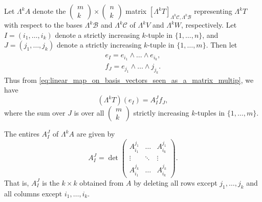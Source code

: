 \documentclass[notoc,notitlepage]{tufte-book}
\begin{document}
Let $\Lambda^k A$ denote the $\left(\begin{smallmatrix} m \\ k \end{smallmatrix}\right)
\times \left(\begin{smallmatrix} n \\ k \end{smallmatrix}\right)$ matrix $[\Lambda^k
T]_{\Lambda^k \mathcal{C}, \Lambda^k \mathcal{B}}$ representing $\Lambda^k T$
with respect to the bases $\Lambda^k \mathcal{B}$ and $\Lambda^k \mathcal{C}$ of
$\Lambda^k V$ and $\Lambda^k W$, respectively. Let $I = (i_1, \ldots, i_k)$
denote a strictly increasing $k$-tuple in $\{ 1, \ldots, n \}$, and $J = (j_1,
\ldots, j_k)$ denote a strictly increasing $k$-tuple in $\{ 1, \ldots, m \}$.
Then let
\begin{gather*}
  e_I = e_{i_1} \land \hdots \land e_{i_k}, \\
  f_J = e_{j_1} \land \hdots \land j_{j_k}.
\end{gather*}
Thus from \cref{eq:linear_map_on_basis_vectors_seen_as_a_matrix_multip}, we have
\begin{equation}\label{eq:linear_map_on_decomp_k_forms_seen_as_a_matrix_multip}
  (\Lambda^k T)(e_I) = A^J_I f_J,
\end{equation}
where the sum over $J$ is over all $\left( \begin{smallmatrix} m \\ k
  \end{smallmatrix} \right)$ strictly increasing $k$-tuples in $\{ 1, \ldots, m
\}$.

\begin{propo}\label{propo:structure_of_the_determinant_of_a_linear_map_of_k_forms}
  The entires $A^J_I$ of $\Lambda^k A$ are given by
  \begin{equation}\label{eq:structure_of_the_determinant_of_a_linear_map_of_k_forms}
    A^J_I = \det \begin{pmatrix}
      A^{j_1}_{i_1} & \hdots & A^{j_1}_{i_k} \\
      \vdots & \ddots & \vdots \\
      A^{j_k}_{i_1} & \hdots & A^{j_k}_{i_k}
    \end{pmatrix}.
  \end{equation}
  That is, $A^J_I$ is the $k \times k$  obtained from $A$ by
  deleting all rows except $j_1, \ldots, j_k$ and all columns except $i_1,
  \ldots, i_k$.
\end{propo}
\end{document}
